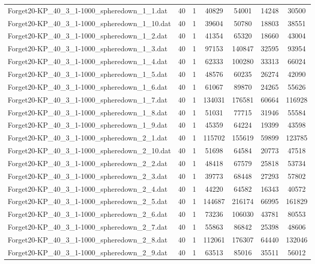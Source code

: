 \begin{table}[!ht]
\begin{tabular}{lcccccc}
Forget20-KP\_40\_3\_1-1000\_spheredown\_1\_1.dat & 40 & 1 & 40829 & 54001 & 14248 & 30500 \\
Forget20-KP\_40\_3\_1-1000\_spheredown\_1\_10.dat & 40 & 1 & 39604 & 50780 & 18803 & 38551 \\
Forget20-KP\_40\_3\_1-1000\_spheredown\_1\_2.dat & 40 & 1 & 41354 & 65320 & 18660 & 43004 \\
Forget20-KP\_40\_3\_1-1000\_spheredown\_1\_3.dat & 40 & 1 & 97153 & 140847 & 32595 & 93954 \\
Forget20-KP\_40\_3\_1-1000\_spheredown\_1\_4.dat & 40 & 1 & 62333 & 100280 & 33313 & 66024 \\
Forget20-KP\_40\_3\_1-1000\_spheredown\_1\_5.dat & 40 & 1 & 48576 & 60235 & 26274 & 42090 \\
Forget20-KP\_40\_3\_1-1000\_spheredown\_1\_6.dat & 40 & 1 & 61067 & 89870 & 24265 & 55626 \\
Forget20-KP\_40\_3\_1-1000\_spheredown\_1\_7.dat & 40 & 1 & 134031 & 176581 & 60664 & 116928 \\
Forget20-KP\_40\_3\_1-1000\_spheredown\_1\_8.dat & 40 & 1 & 51031 & 77715 & 31946 & 55584 \\
Forget20-KP\_40\_3\_1-1000\_spheredown\_1\_9.dat & 40 & 1 & 45359 & 64224 & 19399 & 43598 \\
Forget20-KP\_40\_3\_1-1000\_spheredown\_2\_1.dat & 40 & 1 & 115702 & 155619 & 59899 & 123785 \\
Forget20-KP\_40\_3\_1-1000\_spheredown\_2\_10.dat & 40 & 1 & 51698 & 64584 & 20773 & 47518 \\
Forget20-KP\_40\_3\_1-1000\_spheredown\_2\_2.dat & 40 & 1 & 48418 & 67579 & 25818 & 53734 \\
Forget20-KP\_40\_3\_1-1000\_spheredown\_2\_3.dat & 40 & 1 & 39773 & 68448 & 27293 & 57802 \\
Forget20-KP\_40\_3\_1-1000\_spheredown\_2\_4.dat & 40 & 1 & 44220 & 64582 & 16343 & 40572 \\
Forget20-KP\_40\_3\_1-1000\_spheredown\_2\_5.dat & 40 & 1 & 144687 & 216174 & 66995 & 161829 \\
Forget20-KP\_40\_3\_1-1000\_spheredown\_2\_6.dat & 40 & 1 & 73236 & 106030 & 43781 & 80553 \\
Forget20-KP\_40\_3\_1-1000\_spheredown\_2\_7.dat & 40 & 1 & 55863 & 86842 & 25398 & 48606 \\
Forget20-KP\_40\_3\_1-1000\_spheredown\_2\_8.dat & 40 & 1 & 112061 & 176307 & 64440 & 132046 \\
Forget20-KP\_40\_3\_1-1000\_spheredown\_2\_9.dat & 40 & 1 & 63513 & 85016 & 35511 & 56012 \\

\end{tabular}
\end{table}
